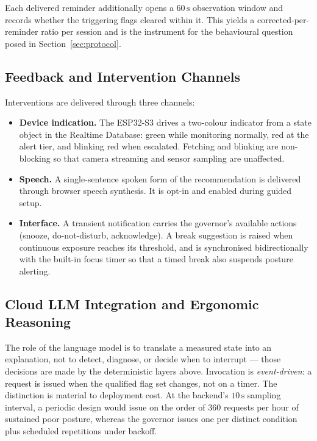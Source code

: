 Each delivered reminder additionally opens a $60\,\text{s}$ observation window and records whether
the triggering flags cleared within it. This yields a corrected-per-reminder ratio per session and
is the instrument for the behavioural question posed in Section~\ref{sec:protocol}.

\subsection{Feedback and Intervention Channels}
\label{subsec:feedback}

Interventions are delivered through three channels:

\begin{itemize}
    \item \textbf{Device indication.} The ESP32-S3 drives a two-colour indicator from a state
    object in the Realtime Database: green while monitoring normally, red at the alert tier, and
    blinking red when escalated. Fetching and blinking are non-blocking so that camera streaming
    and sensor sampling are unaffected.
    \item \textbf{Speech.} A single-sentence spoken form of the recommendation is delivered through
    browser speech synthesis. It is opt-in and enabled during guided setup.
    \item \textbf{Interface.} A transient notification carries the governor's available actions
    (snooze, do-not-disturb, acknowledge). A break suggestion is raised when continuous exposure
    reaches its threshold, and is synchronised bidirectionally with the built-in focus timer so
    that a timed break also suspends posture alerting.
\end{itemize}

\subsection{Cloud LLM Integration and Ergonomic Reasoning}
\label{subsec:llm}

The role of the language model \cite{llm_reasoning} is to translate a measured state into an
explanation, not to detect, diagnose, or decide when to interrupt --- those decisions are made by
the deterministic layers above. Invocation is \emph{event-driven}: a request is issued when the qualified flag set
changes, not on a timer. The distinction is material to deployment cost. At the backend's
$10\,\text{s}$ sampling interval, a periodic design would issue on the order of $360$ requests per
hour of sustained poor posture, whereas the governor issues one per distinct condition plus
scheduled repetitions under backoff.

